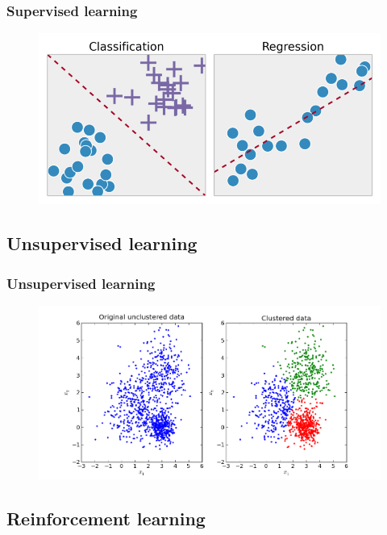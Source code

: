 \documentclass[]{beamer}
\begin{document}
\begin{frame}
\frametitle{Supervised learning}
\begin{figure}
\includegraphics[scale=.35]{imgs/supervised_learning.png}
\end{figure}
\end{frame}

\subsection{Unsupervised learning}

\begin{frame}
\frametitle{Unsupervised learning}
\begin{figure}
\includegraphics[scale=.3]{imgs/kmeans.png}
\end{figure}
\end{frame}

\subsection{Reinforcement learning}
\end{document}
